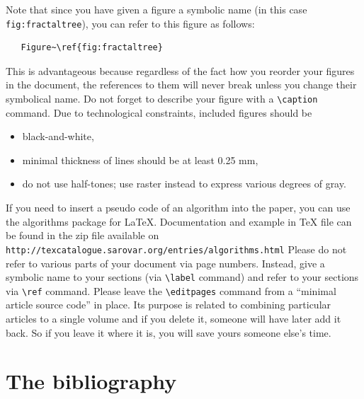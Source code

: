 \documentclass{iitsrc}
\begin{document}
Note that since you have given a figure a symbolic name (in this case
\verb|fig:fractaltree|), you can refer to this figure as follows:
\begin{verbatim}
   Figure~\ref{fig:fractaltree}
\end{verbatim}
This is advantageous because regardless of the fact how you reorder
your figures in the document, the references to them will never
break unless you change their symbolical name.
%
Do not forget to describe your figure with a \verb|\caption| command.
%
Due to technological constraints, included figures should be
\begin{itemize}
\item black-and-white,
\item minimal thickness of lines should be at least 0.25 mm,
\item do not use half-tones; use raster instead to express various
degrees of gray.
\end{itemize}
%
If you need to insert a pseudo code of an algorithm into the
paper, you can use the algorithms package for \LaTeX.
Documentation and example in \TeX{} file can be found in the zip
file available on
\verb|http://texcatalogue.sarovar.org/entries/algorithms.html|
%
Please do not refer to various parts
of your document via page numbers. Instead, give a symbolic name
to your sections (via \verb|\label| command) and refer to your
sections via \verb|\ref| command.
%
Please leave the \verb|\editpages| command from a ``minimal article
source code'' in place. Its
purpose is related to combining particular articles to a single volume
and if you delete it, someone will have later add it back. So if you
leave it where it is, you will save yours someone else's time.
%
\section{The bibliography}
%

\def\BibTeX{{\rmfamily B\kern-.05em%
    \textsc{i\kern-.025em b}\kern-.08em%
    T\kern-.1667em\lower.7ex\hbox{E}\kern-.125emX}}
\end{document}
